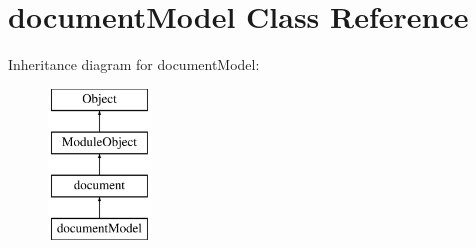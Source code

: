 \hypertarget{classdocumentModel}{\section{document\-Model Class Reference}
\label{classdocumentModel}
}
Inheritance diagram for document\-Model\-:\begin{figure}[H]
\begin{center}
\leavevmode
\includegraphics[height=4.000000cm]{classdocumentModel}
\end{center}
\end{figure}
